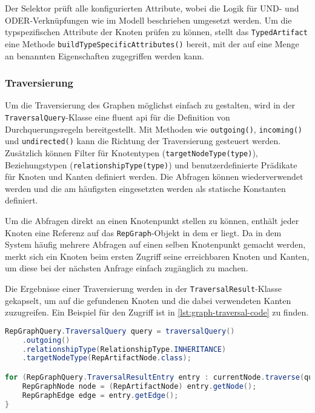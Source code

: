 Der Selektor prüft alle konfigurierten Attribute, wobei die Logik für UND- und ODER-Verknüpfungen wie im Modell beschrieben umgesetzt werden.
Um die typspezifischen Attribute der Knoten prüfen zu können, stellt das \texttt{TypedArtifact} eine Methode \texttt{buildTypeSpecificAttributes()} bereit, mit der auf eine Menge an benannten Eigenschaften zugegriffen werden kann.

\subsubsection{Traversierung}

Um die Traversierung des Graphen möglichst einfach zu gestalten, wird in der \texttt{TraversalQuery}-Klasse eine fluent \acrshort{api} für die Definition von Durchquerungsregeln bereitgestellt.
Mit Methoden wie \texttt{outgoing()}, \texttt{incoming()} und \texttt{undirected()} kann die Richtung der Traversierung gesteuert werden.
Zusätzlich können Filter für Knotentypen (\texttt{targetNodeType(type)}), Beziehungstypen (\texttt{relationshipType(type)}) und benutzerdefinierte Prädikate für Knoten und Kanten definiert werden.
Die Abfragen können wiederverwendet werden und die am häufigsten eingesetzten werden als statische Konstanten definiert.

Um die Abfragen direkt an einen Knotenpunkt stellen zu können, enthält jeder Knoten eine Referenz auf das \texttt{RepGraph}-Objekt in dem er liegt.
Da in dem System häufig mehrere Abfragen auf einen selben Knotenpunkt gemacht werden, merkt sich ein Knoten beim ersten Zugriff seine erreichbaren Knoten und Kanten, um diese bei der nächsten Anfrage einfach zugänglich zu machen.

Die Ergebnisse einer Traversierung werden in der \texttt{TraversalResult}-Klasse gekapselt, um auf die gefundenen Knoten und die dabei verwendeten Kanten zuzugreifen.
Ein Beispiel für den Zugriff ist in \autoref{lst:graph-traversal-code} zu finden.

\begin{lstlisting}[language=Java,caption={Durchquerungsabfragen in Java},label=lst:graph-traversal-code,basicstyle=\ttfamily\scriptsize]
RepGraphQuery.TraversalQuery query = traversalQuery()
    .outgoing()
    .relationshipType(RelationshipType.INHERITANCE)
    .targetNodeType(RepArtifactNode.class);

for (RepGraphQuery.TraversalResultEntry entry : currentNode.traverse(query)) {
    RepGraphNode node = (RepArtifactNode) entry.getNode();
    RepGraphEdge edge = entry.getEdge();
}
\end{lstlisting}

